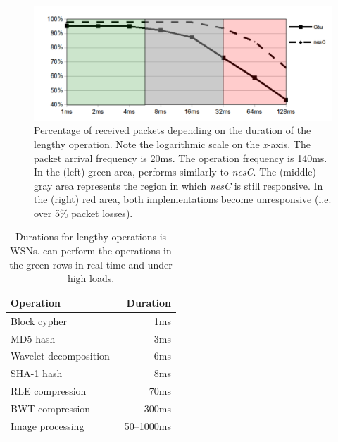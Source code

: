 \begin{figure}[t]
\includegraphics[width=\linewidth,clip=true,trim=5px 0px 5px 0px]{radio1}
\caption{ Percentage of received packets depending on the duration of the 
lengthy operation.  \newline
{\small %
Note the logarithmic scale on the \emph{x}-axis.
The packet arrival frequency is 20ms.
The operation frequency is 140ms.
In the (left) green area, \CEU performs similarly to \emph{nesC}.
The (middle) gray area represents the region in which \emph{nesC} is still 
responsive.
In the (right) red area, both implementations become unresponsive (i.e. over 
5\% packet losses).
}%
\label{fig.radio1}
}
\end{figure}


\begin{table}[t]
\begin{center}
\begin{tabular}{ | l | r | }
\hline
\rowcolor{darkgray}
    Operation          & Duration  \\ \hline
\hline
\rowcolor{lightgreen}
    Block cypher~\cite{wsn.tinysec,wsn.crypto}  & 1ms           \\ \hline
\rowcolor{lightgreen}
    MD5 hash~\cite{wsn.crypto}                  & 3ms           \\ \hline
\rowcolor{lightgreen}
    Wavelet decomposition~\cite{wsn.wavelet}    & 6ms           \\ \hline
\hline
\rowcolor{lightred}
    SHA-1 hash~\cite{wsn.crypto}                & 8ms           \\ \hline
\rowcolor{lightred}
    RLE compression~\cite{wsn.compression}      & 70ms          \\ \hline
\rowcolor{lightred}
    BWT compression~\cite{wsn.compression}      & 300ms         \\ \hline
\rowcolor{lightred}
    Image processing~\cite{wsn.cyclops}         & 50--1000ms    \\ \hline
\end{tabular}
\caption{Durations for lengthy operations is WSNs. \newline
{\small %
\CEU can perform the operations in the green rows in real-time and under high 
loads.
}%
\label{tab.durs}
}
\end{center}
\end{table}

